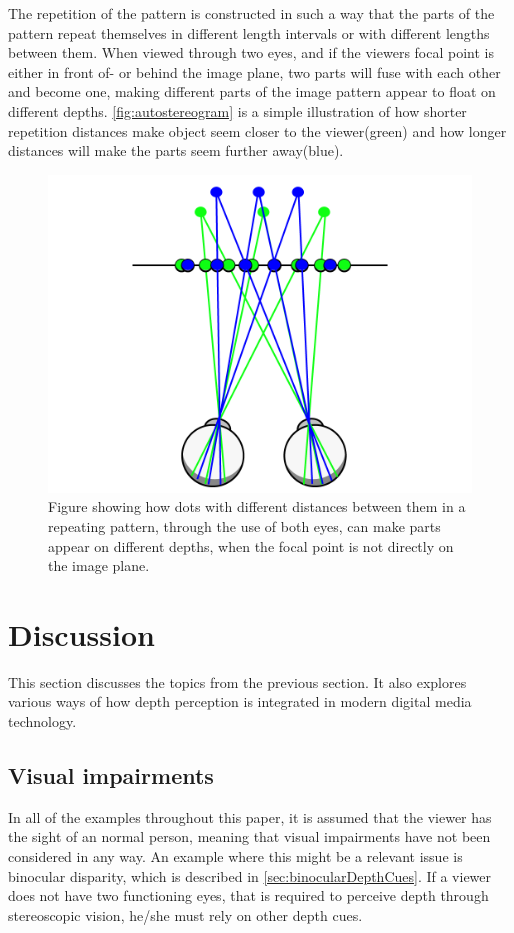 The repetition of the pattern is constructed in such a way that the parts of the pattern repeat themselves in different length intervals or with different lengths between them. When viewed through two eyes, and if the viewers focal point is either in front of- or behind the image plane, two parts will fuse with each other and become one, making different parts of the image pattern appear to float on different depths\citep{autostereogramNguyen}. \autoref{fig:autostereogram} is a simple illustration of how shorter repetition distances make object seem closer to the viewer(green) and how longer distances will make the parts seem further away(blue). 

\begin{figure}[H]
	\centering
	\includegraphics[width=0.8\linewidth]{figure/Analysis/autoStereogram.png}
	\caption{Figure showing how dots with different distances between them in a repeating pattern, through the use of both eyes, can make parts appear on different depths, when the focal point is not directly on the image plane.}
	\label{fig:autostereogram}
\end{figure}

\section{Discussion}
This section discusses the topics from the previous section. It also explores various ways of how depth perception is integrated in modern digital media technology.

	\subsection{Visual impairments}
	In all of the examples throughout this paper, it is assumed that the viewer has the sight of an normal person, meaning that visual impairments have not been considered in any way. An example where this might be a relevant issue is binocular disparity, which is described in \autoref{sec:binocularDepthCues}. If a viewer does not have two functioning eyes, that is required to perceive depth through stereoscopic vision, he/she must rely on other depth cues.


